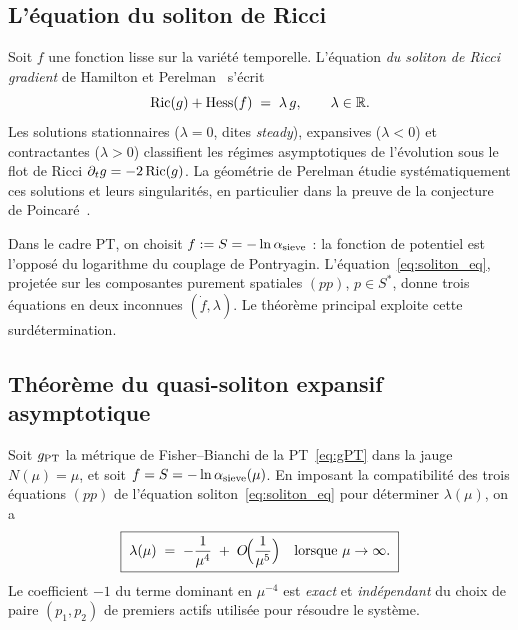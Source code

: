 \subsection{L'équation du soliton de Ricci}
\label{sec:soliton:eq}

Soit $f$ une fonction lisse sur la variété temporelle. L'équation \emph{du soliton de Ricci gradient} de Hamilton et Perelman~\cite{Hamilton1982,Perelman2002} s'écrit
\begin{equation}
\mathrm{Ric}(g) + \mathrm{Hess}(f) \;=\; \lambda\, g, \qquad \lambda \in \mathbb R.
\label{eq:soliton_eq}
\end{equation}
Les solutions stationnaires ($\lambda = 0$, dites \emph{steady}), expansives ($\lambda < 0$) et contractantes ($\lambda > 0$) classifient les régimes asymptotiques de l'évolution sous le flot de Ricci $\partial_t g = -2\,\mathrm{Ric}(g)$. La géométrie de Perelman étudie systématiquement ces solutions et leurs singularités, en particulier dans la preuve de la conjecture de Poincaré~\cite{Perelman2002}.

Dans le cadre PT, on choisit $f := S = -\ln \alpha_{\rm sieve}$ : la fonction de potentiel est l'opposé du logarithme du couplage de Pontryagin. L'équation~\eqref{eq:soliton_eq}, projetée sur les composantes purement spatiales $(pp)$, $p \in S^{*}$, donne trois équations en deux inconnues $(\dot f, \lambda)$. Le théorème principal exploite cette surdétermination.

\subsection{Théorème du quasi-soliton expansif asymptotique}
\label{sec:soliton:thm}

\begin{theoreme}
\label{thm:soliton_PT}
Soit $g_{\rm PT}$ la métrique de Fisher--Bianchi de la PT~\eqref{eq:gPT} dans la jauge $N(\mu) = \mu$, et soit $f = S = -\ln \alpha_{\rm sieve}(\mu)$. En imposant la compatibilité des trois équations $(pp)$ de l'équation soliton~\eqref{eq:soliton_eq} pour déterminer $\lambda(\mu)$, on a
\begin{equation}
\boxed{\;
\lambda(\mu) \;=\; -\dfrac{1}{\mu^{4}} \;+\; O\!\Bigl(\dfrac{1}{\mu^{5}}\Bigr)
\quad\text{lorsque } \mu \to \infty.
\;}
\label{eq:lambda_main}
\end{equation}
Le coefficient $-1$ du terme dominant en $\mu^{-4}$ est \emph{exact} et \emph{indépendant} du choix de paire $(p_1, p_2)$ de premiers actifs utilisée pour résoudre le système.
\end{theoreme}

